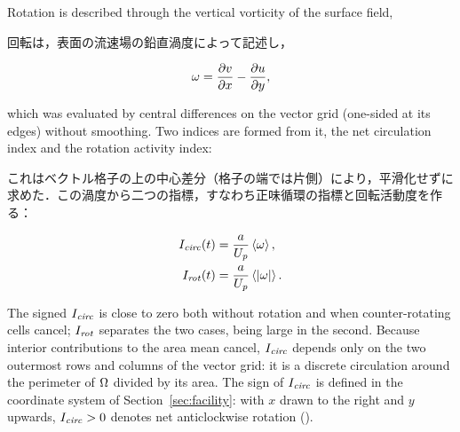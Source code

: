 \begin{en}[M5-3]
Rotation is described through the vertical vorticity of the surface field,
\end{en}
\begin{ja}
回転は，表面の流速場の鉛直渦度によって記述し，
\end{ja}
\begin{equation}
\omega = \frac{\partial v}{\partial x} - \frac{\partial u}{\partial y} ,
\label{eq:vort}
\end{equation}
\begin{en}
which was evaluated by central differences on the vector grid (one-sided at its edges) without smoothing. Two indices are formed from it, the net circulation index and the rotation activity index:
\end{en}
\begin{ja}
これはベクトル格子の上の中心差分（格子の端では片側）により，平滑化せずに求めた．この渦度から二つの指標，すなわち正味循環の指標と回転活動度を作る：
\end{ja}
\begin{align}
I_{\mathit{circ}}(t) &= \frac{a}{U_{\mathit{p}}} \left\langle \omega \right\rangle , \label{eq:Icirc}\\
I_{\mathit{rot}}(t) &= \frac{a}{U_{\mathit{p}}} \left\langle \left| \omega \right| \right\rangle . \label{eq:Irot}
\end{align}
\begin{en}
The signed $I_{\mathit{circ}}$ is close to zero both without rotation and when counter-rotating cells cancel; $I_{\mathit{rot}}$ separates the two cases, being large in the second. Because interior contributions to the area mean cancel, $I_{\mathit{circ}}$ depends only on the two outermost rows and columns of the vector grid: it is a discrete circulation around the perimeter of $\Omega$ divided by its area. The sign of $I_{\mathit{circ}}$ is defined in the coordinate system of Section~\ref{sec:facility}: with $x$ drawn to the right and $y$ upwards, $I_{\mathit{circ}} > 0$ denotes net anticlockwise rotation ().
\end{en}
